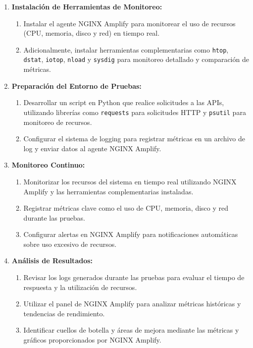 \begin{enumerate}
    \item \textbf{Instalación de Herramientas de Monitoreo:}
    \begin{enumerate}[label*=\alph*.]
        \item Instalar el agente NGINX Amplify para monitorear el uso de recursos (CPU, memoria, disco y red) en tiempo real.
        \item Adicionalmente, instalar herramientas complementarias como \texttt{htop}, \texttt{dstat}, \texttt{iotop}, \texttt{nload} y \texttt{sysdig} para monitoreo detallado y comparación de métricas.
    \end{enumerate}

    \item \textbf{Preparación del Entorno de Pruebas:}
    \begin{enumerate}[label*=\alph*.]
        \item Desarrollar un script en Python que realice solicitudes a las APIs, utilizando librerías como \texttt{requests} para solicitudes HTTP y \texttt{psutil} para monitoreo de recursos.
        \item Configurar el sistema de logging para registrar métricas en un archivo de log y enviar datos al agente NGINX Amplify.
    \end{enumerate}

    \item \textbf{Monitoreo Continuo:}
    \begin{enumerate}[label*=\alph*.]
        \item Monitorizar los recursos del sistema en tiempo real utilizando NGINX Amplify y las herramientas complementarias instaladas.
        \item Registrar métricas clave como el uso de CPU, memoria, disco y red durante las pruebas.
        \item Configurar alertas en NGINX Amplify para notificaciones automáticas sobre uso excesivo de recursos.
    \end{enumerate}

    \item \textbf{Análisis de Resultados:}
    \begin{enumerate}[label*=\alph*.]
        \item Revisar los logs generados durante las pruebas para evaluar el tiempo de respuesta y la utilización de recursos.
        \item Utilizar el panel de NGINX Amplify para analizar métricas históricas y tendencias de rendimiento.
        \item Identificar cuellos de botella y áreas de mejora mediante las métricas y gráficos proporcionados por NGINX Amplify.
    \end{enumerate}


\end{enumerate}
